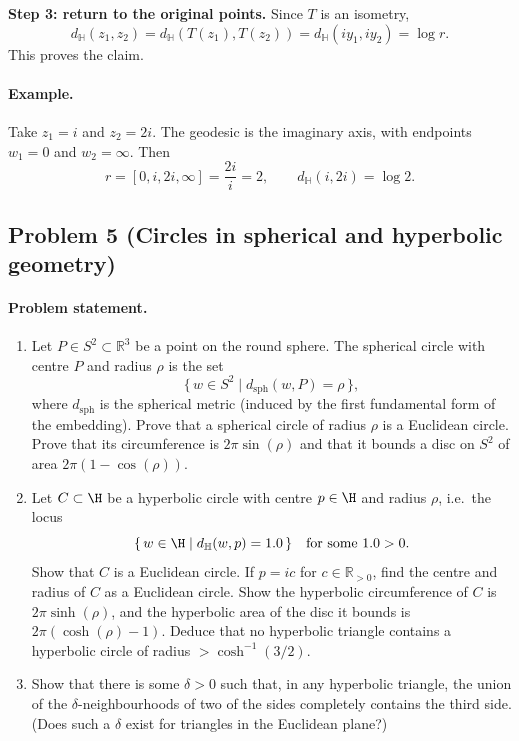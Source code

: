 \documentclass[12pt,a4paper]{article}
\newcommand{\hyp}{\mathbb{H}}
\newcommand{\R}{\mathbb{R}}
\theoremstyle{plain}
\newcommand{\sph}{\mathrm{sph}}
\theoremstyle{definition}      %
\begin{document}
	\medskip
	\noindent\textbf{Step 3: return to the original points.}
	Since $T$ is an isometry,
	\[
	d_{\hyp}(z_1,z_2)=d_{\hyp}(T(z_1),T(z_2))=d_{\hyp}(i y_1,i y_2)=\log r.
	\]
	This proves the claim.
	
	\paragraph{Example.}
	Take $z_1=i$ and $z_2=2i$. The geodesic is the imaginary axis, with endpoints
	$w_1=0$ and $w_2=\infty$. Then
	\[
	r=[0,i,2i,\infty]=\frac{2i}{i}=2,
	\qquad
	d_{\hyp}(i,2i)=\log 2.
	\]
	
	\subsection*{Problem 5 (Circles in spherical and hyperbolic geometry)}
	
	\paragraph{Problem statement.}
	\begin{enumerate}
		\item Let $P\in S^2\subset\R^3$ be a point on the round sphere.
		The spherical circle with centre $P$ and radius $\rho$ is the set
		\[
		\{\,w\in S^2 \mid d_{\sph}(w,P)=\rho\,\},
		\]
		where $d_{\sph}$ is the spherical metric (induced by the first fundamental form
		of the embedding).
		Prove that a spherical circle of radius $\rho$ is a Euclidean circle.
		Prove that its circumference is $2\pi\sin(\rho)$ and that it bounds a disc on
		$S^2$ of area $2\pi(1-\cos(\rho))$.
		
		\item Let $C\subset\H$ be a hyperbolic circle with centre $p\in\H$ and radius $\rho$,
		i.e.\ the locus
		\[
		\{\,w\in\H \mid d_{\hyp}(w,p)=\rho\,\}
		\quad\text{for some }\rho>0.
		\]
		Show that $C$ is a Euclidean circle. If $p=ic$ for $c\in\R_{>0}$, find the centre
		and radius of $C$ as a Euclidean circle.
		Show the hyperbolic circumference of $C$ is $2\pi\sinh(\rho)$, and the hyperbolic
		area of the disc it bounds is $2\pi(\cosh(\rho)-1)$.
		Deduce that no hyperbolic triangle contains a hyperbolic circle of radius
		$>\cosh^{-1}(3/2)$.
		
		\item Show that there is some $\delta>0$ such that, in any hyperbolic triangle,
		the union of the $\delta$-neighbourhoods of two of the sides completely contains
		the third side. (Does such a $\delta$ exist for triangles in the Euclidean plane?)
	\end{enumerate}
	
\end{document}
